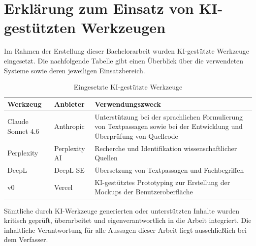 \chapter{Erklärung zum Einsatz von KI-gestützten Werkzeugen}

Im Rahmen der Erstellung dieser Bachelorarbeit wurden KI-gestützte Werkzeuge
eingesetzt. Die nachfolgende Tabelle gibt einen Überblick über die verwendeten
Systeme sowie deren jeweiligen Einsatzbereich.

\begin{table}[htbp]
    \centering
  \begin{tabular}{p{3.5cm} p{3.5cm} p{5cm}}
    \toprule
    \textbf{Werkzeug} & \textbf{Anbieter} & \textbf{Verwendungszweck} \\
    \midrule
    Claude Sonnet 4.6 & Anthropic & Unterstützung bei der sprachlichen
                                   Formulierung von Textpassagen sowie bei der Entwicklung und Überprüfung von Quellcode \\
    \addlinespace
    Perplexity       & Perplexity AI & Recherche und Identifikation
                                       wissenschaftlicher Quellen \\
    \addlinespace
    DeepL             & DeepL SE & Übersetzung von Textpassagen und
                                   Fachbegriffen \\
                                   \addlinespace
    v0               & Vercel & KI-gestütztes Prototyping zur Erstellung 
                             der Mockups der Benutzeroberfläche \\
    \bottomrule
  \end{tabular}
  \caption{Eingesetzte KI-gestützte Werkzeuge}
  \label{tab:ki-werkzeuge}
\end{table}

Sämtliche durch KI-Werkzeuge generierten oder unterstützten Inhalte wurden
kritisch geprüft, überarbeitet und eigenverantwortlich in die Arbeit integriert.
Die inhaltliche Verantwortung für alle Aussagen dieser Arbeit liegt
ausschließlich bei dem Verfasser.